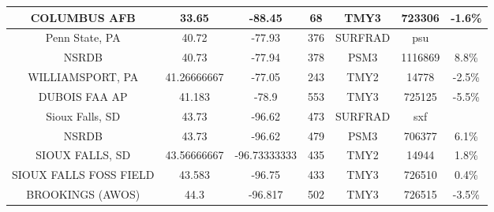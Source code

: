 \documentclass[conference]{IEEEtran}
\begin{document}
\begin{table}[htbp]
\begin{center}
\begin{tabular}{|c|c|c|c|c|c|c|}
COLUMBUS AFB&33.65&-88.45&68&TMY3&723306&-1.6\% \\
\hline
Penn State, PA&40.72&-77.93&376&SURFRAD&psu& \\
NSRDB&40.73&-77.94&378&PSM3&1116869&8.8\% \\
WILLIAMSPORT, PA&41.26666667&-77.05&243&TMY2&14778&-2.5\% \\
DUBOIS FAA AP&41.183&-78.9&553&TMY3&725125&-5.5\% \\
\hline
Sioux Falls, SD&43.73&-96.62&473&SURFRAD&sxf& \\
NSRDB&43.73&-96.62&479&PSM3&706377&6.1\% \\
SIOUX FALLS, SD&43.56666667&-96.73333333&435&TMY2&14944&1.8\% \\
SIOUX FALLS FOSS FIELD&43.583&-96.75&433&TMY3&726510&0.4\% \\
BROOKINGS (AWOS)&44.3&-96.817&502&TMY3&726515&-3.5\% \\
\hline
\end{tabular}
\label{table:surfrad-tmy-location-summary}
\end{center}
\end{table}
\end{document}
